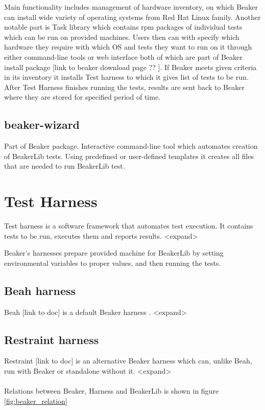 Main functionality includes management of hardware inventory, on which Beaker can install wide variety  of operating systems from Red Hat Linux family. Another notable part  is Task library which contains rpm packages of individual tests which can be run on provided machines. 
Users then can with specify which hardware they require with which OS and tests they want to run on it through either command-line tools or web interface both of which are part of Beaker install package [link to beaker download page ?? ]. If Beaker meets given criteria in its inventory it installs Test harness to which it gives list of tests to be run.  After Test Harness finishes running the tests, results are sent back to Beaker where they are stored for specified period of time. 

\subsection{beaker-wizard}
Part of Beaker package. Interactive command-line tool which automates creation of BeakerLib tests. Using predefined or user-defined templates it creates all files that are needed to run BeakerLib test.

\section{Test Harness}
Test harness is a software framework that automates test execution. It contains tests to be run, executes them and reports results. <expand>

Beaker’s harnesses prepare provided machine for BeakerLib by setting environmental variables to proper values, and then running the tests.

\subsection{Beah harness}
Beah [link to doc] is a default Beaker harness . <expand> 

\subsection{Restraint harness}
Restraint [link to doc] is an alternative Beaker harness which can, unlike Beah, run with Beaker or standalone without it. <expand>
\\
\\
Relations between Beaker, Harness and BeakerLib is shown in figure \ref{fig:beaker_relation}


